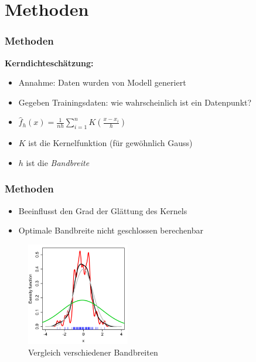 \section{Methoden}

\begin{frame}
	\frametitle{Methoden}
	
	\textbf{Kerndichteschätzung:}
	\begin{itemize}
		\item Annahme: Daten wurden von Modell generiert
		\item Gegeben Trainingsdaten: wie wahrscheinlich ist ein Datenpunkt?
		\item $\hat{f}_h(x) = \frac{1}{nh}\sum_{i=1}^{n} K(\frac{x - x_i}{h})$
		\item $K$ ist die Kernelfunktion (f\"ur gew\"ohnlich Gauss)
		\item $h$ ist die \textit{Bandbreite}
	\end{itemize}
\end{frame}

\begin{frame}
	\frametitle{Methoden}
	
	\begin{itemize}
		\item Beeinflusst den Grad der Gl\"attung des Kernels
		\item Optimale Bandbreite nicht geschlossen berechenbar
	\end{itemize}
	
	\begin{figure}[p]
		\centering
		\includegraphics[width=0.4\textwidth]{figures/Bandwidth_comparison.png}
		\caption{Vergleich verschiedener Bandbreiten}
		\label{fig:bandwidth}
	\end{figure}
\end{frame}

